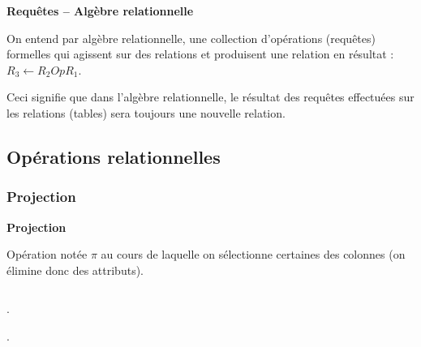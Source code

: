 \documentclass[10pt]{article}
\newif\ifprof
\begin{document}
\begin{defi}
\textbf{Requêtes -- Algèbre relationnelle}

On entend par algèbre relationnelle, une collection d'opérations (requêtes) formelles qui agissent sur des relations et produisent une relation en résultat : $R_3 \leftarrow R_2 Op R_1$.
\end{defi}

Ceci signifie que dans l'algèbre relationnelle, le résultat des requêtes effectuées sur les relations (tables) sera toujours une nouvelle relation. 
%
%
%
%


\subsection{Opérations relationnelles}
\subsubsection{Projection}

\begin{defi}

\textbf{Projection}

Opération notée $\pi$ au cours de laquelle on sélectionne certaines des colonnes (on élimine donc des attributs). 
\ifprof

$$
 R_2 \leftarrow \pi_{\text{attribut 1, attribut 2, ...}}(R_1)
$$

\else
$$ \quad $$
$$ \quad $$
\fi

\ifprof
\begin{envsql}
\begin{sql}
SELECT attribut_1,attribut_2 FROM nom_table;

SELECT * FROM nom_table;
\end{sql}
\end{envsql}
\else
\begin{envsql}
\begin{sql}
. 
 

.
\end{sql}
\end{envsql}
\fi
\end{defi}
\end{document}
